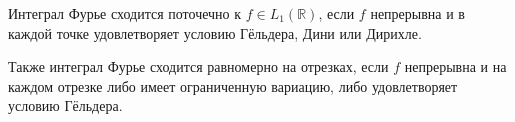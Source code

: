 
\begin{to_con}
    Интеграл Фурье сходится поточечно к $f \in L_1 (\mathbb{R})$, если $f$ непрерывна и в каждой точке удовлетворяет условию Гёльдера, Дини или Дирихле. 

    Также интеграл Фурье сходится равномерно на отрезках, если $f$ непрерывна и на каждом отрезке либо имеет ограниченную вариацию, либо удовлетворяет условию Гёльдера. 
\end{to_con}